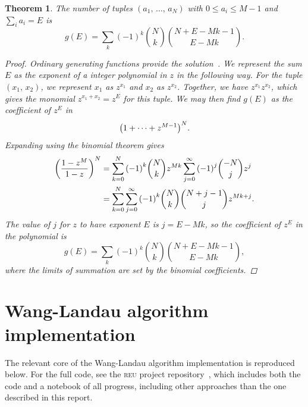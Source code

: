 \documentclass[aps,reprint,floatfix]{revtex4-2}
\theoremstyle{plain}
\newtheorem{thm}{Theorem}[section]
\theoremstyle{definition}
\renewcommand\leq\leqslant%
\begin{document}
\begin{thm}\label{thm:bw-g}
  The number of tuples $(a_1,\, \ldots,\, a_N)$ with $0 \leq a_i \leq M - 1$ and
  $\sum_i a_i = E$ is
  \[
    g(E)
    = \sum_k {(-1)}^k \binom{N}{k} \binom{N + E - Mk - 1}{E - Mk}.
  \]
  \begin{proof}
    Ordinary generating functions provide the solution~\cite{genfunc}. We represent the sum $E$
    as the exponent of a integer polynomial in $z$ in the following way. For the
    tuple $(x_1,\, x_2)$, we represent $x_1$ as $z^{x_1}$ and $x_2$ as
    $z^{x_2}$. Together, we have $z^{x_1} z^{x_2}$, which gives the monomial
    $z^{x_1 + x_2} = z^E$ for this tuple. We may then find $g(E)$ as the
    coefficient of $z^E$ in
    \[
      {\qty(1 + \cdots + z^{M-1})}^N.
    \]
    Expanding using the binomial theorem gives
    \begin{align}
      {\qty(\frac{1 - z^M}{1 - z})}^N
      &= \sum_{k=0}^N {(-1)}^k \binom{N}{k} z^{Mk}
      \sum_{j=0}^\infty {(-1)}^j \binom{-N}{j} z^j \\
      &= \sum_{k=0}^N \sum_{j=0}^\infty {(-1)}^k \binom{N}{k}
      \binom{N + j - 1}{j} z^{Mk + j}.
    \end{align}
    The value of $j$ for $z$ to have exponent $E$ is $j = E - Mk$, so the
    coefficient of $z^E$ in the polynomial is
    \begin{equation}
      g(E)
      = \sum_k {(-1)}^k \binom{N}{k} \binom{N + E - Mk - 1}{E - Mk},
    \end{equation}
    where the limits of summation are set by the binomial coefficients.
  \end{proof}
\end{thm}

\section{Wang-Landau algorithm implementation}\label{sec:wanglandau-core}

The relevant core of the Wang-Landau algorithm implementation is reproduced
below. For the full code, see the \textsc{reu} project
repository~\cite{rpi-reu-notebook}, which includes both the code and a notebook
of all progress, including other approaches than the one described in this
report.

\inputminted{python}{wanglandau-core.py}

\hypersetup{urlcolor=Mahogany}

\end{document}
